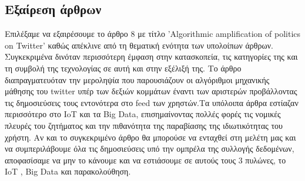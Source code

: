 \documentclass{article}
\begin{document}
\subsection*{Εξαίρεση άρθρων}
Επιλέξαμε να εξαιρέσουμε το άρθρο 8 με τίτλο 'Algorithmic amplification of politics on Twitter' καθώς απέκλινε από τη θεματική ενότητα των υπολοίπων άρθρων. Συγκεκριμένα δινόταν περισσότερη έμφαση στην κατασκοπεία, τις κατηγορίες της και τη συμβολή της τεχνολογίας σε αυτή και στην εξέλιξή της. Το άρθρο διαπραγματευόταν την μεροληψία που παρουσιάζουν οι αλγόριθμοι μηχανικής μάθησης του twitter υπέρ των δεξιών κομμάτων έναντι των αριστερών προβάλλοντας τις δημοσιεύσεις τους εντονότερα στο feed των χρηστών.Τα υπόλοιπα άρθρα εστίαζαν περισσότερο στο IoT και τα Big Data, επισημαίνοντας πολλές φορές τις νομικές πλευρές του ζητήματος και την πιθανότητα της παραβίασης της ιδιωτικότητας του χρήστη. Αν και το συγκεκριμένο άρθρο θα μπορούσε να ενταχθεί στη μελέτη μας και να συμπεριλάβουμε όλα τις δημοσιεύσεις υπό την ομπρέλα της συλλογής δεδομένων, αποφασίσαμε να μην το κάνουμε και να εστιάσουμε σε αυτούς τους 3 πυλώνες, το IoT , Big Data και παρακολούθηση.
\end{document}

